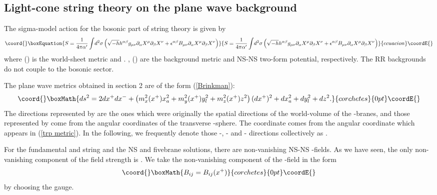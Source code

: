 \documentclass[a4paper,12pt]{article}
\begin{document}
\subsection{Light-cone string theory on the plane wave background}
The sigma-model action for the bosonic part of string theory
is given by
\begin{equation}\coord{}\boxEquation{
S={1\over 4\pi \alpha'}\int\! d^2\sigma \left(\sqrt{-h}
h^{\alpha\beta}g_{\mu\nu}
\partial_\alpha X^\mu\partial_\beta X^\nu
+\epsilon^{\alpha\beta}B_{\mu\nu}
\partial_\alpha X^\mu\partial_\beta X^\nu\right)
\label{sigmamodel}
}{
S={1\over 4\pi \alpha'}\int\! d^2\sigma \left(\sqrt{-h}
h^{\alpha\beta}g_{\mu\nu}
\partial_\alpha X^\mu\partial_\beta X^\nu
+\epsilon^{\alpha\beta}B_{\mu\nu}
\partial_\alpha X^\mu\partial_\beta X^\nu\right)
}{ecuacion}\coordE{}\end{equation}
where \coordHE{} (\myHighlight{$\alpha,\beta=\tau,\sigma$}\coordHE{}) is the 
world-sheet metric and \coordHE{}.
\coordHE{}, \coordHE{} (\coordHE{}) are the 
background metric and NS-NS two-form potential, respectively.
The RR backgrounds do not couple to the bosonic sector.




The plane wave metrics obtained in section 2 are 
of the form (\ref{Brinkman}):
\[\coord{}\boxMath{
ds^2=2dx^{+}dx^{-}+
\left(m^{2}_{x}(x^{+}) x_{a}^{2}+m_{y}^{2} (x^{+}) y_{l}^2
+m_{z}^2(x^{+})z^2\right)
(dx^{+})^2+ dx_{a}^{2}+ dy_{l}^{2}+ dz^2.
}{corchetes}{0pt}\coordE{}\]
The directions represented by \coordHE{}  \coordHE{}
are the ones which were originally the spatial
directions of the world-volume of the \coordHE{}-branes,
and those represented by \coordHE{}  \coordHE{} 
come from the angular coordinates of the transverse
\coordHE{}-sphere. The coordinate
\coordHE{} comes from the angular coordinate which appears
in (\ref{trp metric}). In the following,
we frequently denote those \coordHE{}-, \coordHE{}- and \coordHE{}- directions
collectively as \coordHE{}  \coordHE{}. 

For the fundamental and \coordHE{} string and the 
NS and \coordHE{} fivebrane solutions, 
there are non-vanishing NS-NS \coordHE{}-fields.
As we have seen, the only non-vanishing component of the
field strength is \coordHE{}. We take the non-vanishing 
component of the \coordHE{}-field in the form
\[\coord{}\boxMath{
B_{ij}=B_{ij}(x^+)
}{corchetes}{0pt}\coordE{}\]
by choosing the gauge.
\end{document}
